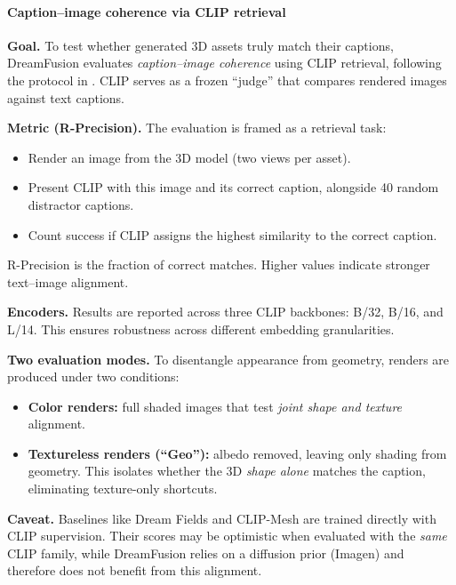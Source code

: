 \begin{enrichment}
\begin{enrichment}
        \paragraph{Caption–image coherence via CLIP retrieval}
        \label{par:chapter23_dreamfusion_clipretrieval}
        
        \textbf{Goal.} To test whether generated 3D assets truly match their captions, DreamFusion evaluates \emph{caption–image coherence} using CLIP retrieval, following the protocol in \cite{poole2022_dreamfusion}. CLIP serves as a frozen ``judge'' that compares rendered images against text captions.  
        
        \medskip
        \noindent
        \textbf{Metric (R-Precision).} The evaluation is framed as a retrieval task:
        \begin{itemize}
            \item Render an image from the 3D model (two views per asset).  
            \item Present CLIP with this image and its correct caption, alongside 40 random distractor captions.  
            \item Count success if CLIP assigns the highest similarity to the correct caption.  
        \end{itemize}
        R-Precision is the fraction of correct matches. Higher values indicate stronger text–image alignment.  
        
        \medskip
        \noindent
        \textbf{Encoders.} Results are reported across three CLIP backbones: B/32, B/16, and L/14. This ensures robustness across different embedding granularities.  
        
        \medskip
        \noindent
        \textbf{Two evaluation modes.} To disentangle appearance from geometry, renders are produced under two conditions:
        \begin{itemize}
            \item \textbf{Color renders:} full shaded images that test \emph{joint shape and texture} alignment.  
            \item \textbf{Textureless renders (``Geo''):} albedo removed, leaving only shading from geometry. This isolates whether the 3D \emph{shape alone} matches the caption, eliminating texture-only shortcuts.  
        \end{itemize}
        
        \medskip
        \noindent
        \textbf{Caveat.} Baselines like Dream Fields and CLIP-Mesh are trained directly with CLIP supervision. Their scores may be optimistic when evaluated with the \emph{same} CLIP family, while DreamFusion relies on a diffusion prior (Imagen) and therefore does not benefit from this alignment.
        

\end{enrichment}
\end{enrichment}
